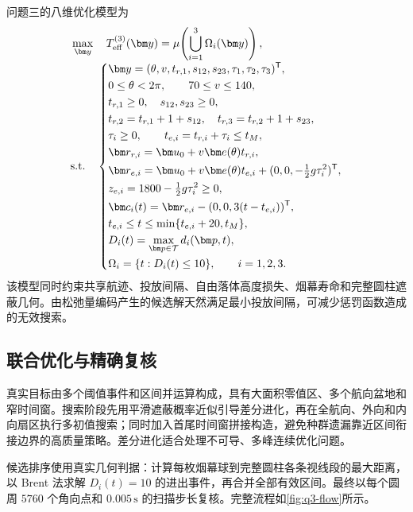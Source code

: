 问题三的八维优化模型为
\begin{equation}
\begin{aligned}
&\max_{\bm y}\quad T_{\mathrm{eff}}^{(3)}(\bm y)
=\mu\!\left(\bigcup_{i=1}^{3}\Omega_i(\bm y)\right),\\[-1mm]
&\text{\rm s.t.}\quad
\left\{\begin{aligned}
&\bm y=(\theta,v,t_{r,1},s_{12},s_{23},\tau_1,\tau_2,\tau_3)^{\mathsf T},\\
&0\le\theta<2\pi,\qquad 70\le v\le140,\\
&t_{r,1}\ge0,\quad s_{12},s_{23}\ge0,\\
&t_{r,2}=t_{r,1}+1+s_{12},\quad t_{r,3}=t_{r,2}+1+s_{23},\\
&\tau_i\ge0,\qquad t_{e,i}=t_{r,i}+\tau_i\le t_M,\\
&\bm r_{r,i}=\bm u_0+v\bm e(\theta)t_{r,i},\\
&\bm r_{e,i}=\bm u_0+v\bm e(\theta)t_{e,i}+(0,0,-\tfrac12g\tau_i^2)^{\mathsf T},\\
&z_{e,i}=1800-\tfrac12g\tau_i^2\ge0,\\
&\bm c_i(t)=\bm r_{e,i}-(0,0,3(t-t_{e,i}))^{\mathsf T},\\
&t_{e,i}\le t\le\min\{t_{e,i}+20,t_M\},\\
&D_i(t)=\displaystyle\max_{\bm p\in\mathcal T}d_i(\bm p,t),\\
&\Omega_i=\{t:D_i(t)\le10\},\qquad i=1,2,3.
\end{aligned}\right.
\end{aligned}
\label{eq:q3-complete-model}
\end{equation}
该模型同时约束共享航迹、投放间隔、自由落体高度损失、烟幕寿命和完整圆柱遮蔽几何。由松弛量编码产生的候选解天然满足最小投放间隔，可减少惩罚函数造成的无效搜索。

\subsection{联合优化与精确复核}

真实目标由多个阈值事件和区间并运算构成，具有大面积零值区、多个航向盆地和窄时间窗。搜索阶段先用平滑遮蔽概率近似引导差分进化，再在全航向、外向和内向扇区执行多初值搜索；同时加入首尾时间窗拼接构造，避免种群遗漏靠近区间衔接边界的高质量策略。差分进化适合处理不可导、多峰连续优化问题\cite{storn1997de}。

候选排序使用真实几何判据：计算每枚烟幕球到完整圆柱各条视线段的最大距离，以 Brent 法求解 $D_i(t)=10$ 的进出事件\cite{brent1973algorithms}，再合并全部有效区间。最终以每个圆周 $5760$ 个角向点和 $0.005\,\mathrm{s}$ 的扫描步长复核。完整流程如\cref{fig:q3-flow}所示。

